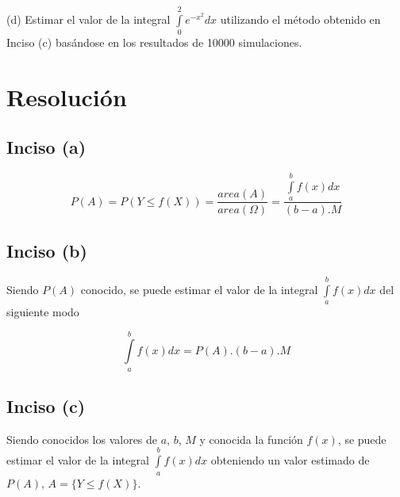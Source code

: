 \documentclass[a4paper]{article}
\begin{document}
(d) Estimar el valor de la integral $\int\limits_0^2 e^{-x^{2}} dx$ utilizando
el método obtenido en Inciso (c) basándose en los resultados de 10000
simulaciones.

\newpage
\section*{Resolución}
\subsection*{Inciso (a)}
\begin{figure}[h]
  \centering
\end{figure}

\[
  P(A) = P( Y \leqslant f(X) ) = \frac{ area(A) }{ area(\Omega) } =
  \frac{ \int\limits_a^b f(x) dx }{ (b-a) . M }
\]

\subsection*{Inciso (b)}

Siendo $P(A)$ conocido, se puede estimar el valor de la integral
$\int\limits_a^b f(x) dx$ del siguiente modo

\[
  \int\limits_a^b f(x) dx = P(A).(b-a) . M
\]

\subsection*{Inciso (c)}
Siendo conocidos los valores de $a$, $b$, $M$ y conocida la función $f(x)$,
se puede estimar el valor de la integral $\int\limits_a^b f(x) dx$ obteniendo
un valor estimado de $P(A)$, $A = \{ Y \leqslant f(X) \}$. \\
\end{document}
